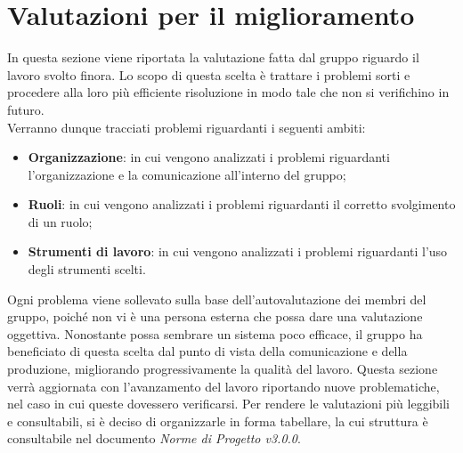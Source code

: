 \section{Valutazioni per il miglioramento}
In questa sezione viene riportata la valutazione fatta dal gruppo riguardo il 
lavoro svolto finora. Lo scopo di questa scelta è trattare i problemi sorti e
procedere alla loro più efficiente risoluzione in modo tale che non si verifichino
in futuro. \\
Verranno dunque tracciati problemi riguardanti i seguenti ambiti:

\begin{itemize}
	\item \textbf{Organizzazione}: in cui vengono analizzati i problemi riguardanti 
		l'organizzazione e la comunicazione all'interno del gruppo;
	\item \textbf{Ruoli}: in cui vengono analizzati i problemi riguardanti il 
		corretto svolgimento di un ruolo;
	\item \textbf{Strumenti di lavoro}: in cui vengono analizzati i problemi riguardanti 
		l'uso degli strumenti scelti.
\end{itemize}

\noindent Ogni problema viene sollevato sulla base dell'autovalutazione dei membri del 
gruppo, poiché non vi è una persona esterna che possa dare una valutazione
oggettiva. Nonostante possa sembrare un sistema poco efficace, il gruppo ha 
beneficiato di questa scelta dal punto di vista della comunicazione e della produzione, migliorando progressivamente la qualità del lavoro.
Questa sezione verrà aggiornata con l'avanzamento del lavoro riportando nuove 
problematiche, nel caso in cui queste dovessero verificarsi.
Per rendere le valutazioni più leggibili e consultabili, si è
deciso di organizzarle in forma tabellare, la cui struttura è 
consultabile nel documento \textit{Norme di Progetto v3.0.0}.

